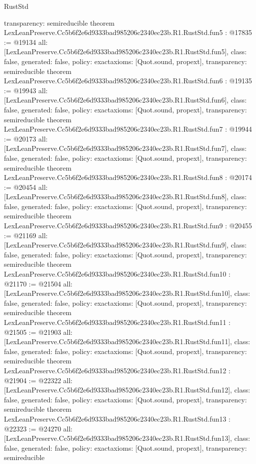 \begin{lexlean}{RustStd}
\begin{coremodule}
{  transparency: semireducible
}
theorem LexLeanPreserve.Cc5b6f2e6d9333bad985206c2340ec23b.R1.RustStd.fun5 : @17835 := @19134 {
  all: [LexLeanPreserve.Cc5b6f2e6d9333bad985206c2340ec23b.R1.RustStd.fun5],
  class: false,
  generated: false,
  policy: exact{axioms: [Quot.sound, propext]},
  transparency: semireducible
}
theorem LexLeanPreserve.Cc5b6f2e6d9333bad985206c2340ec23b.R1.RustStd.fun6 : @19135 := @19943 {
  all: [LexLeanPreserve.Cc5b6f2e6d9333bad985206c2340ec23b.R1.RustStd.fun6],
  class: false,
  generated: false,
  policy: exact{axioms: [Quot.sound, propext]},
  transparency: semireducible
}
theorem LexLeanPreserve.Cc5b6f2e6d9333bad985206c2340ec23b.R1.RustStd.fun7 : @19944 := @20173 {
  all: [LexLeanPreserve.Cc5b6f2e6d9333bad985206c2340ec23b.R1.RustStd.fun7],
  class: false,
  generated: false,
  policy: exact{axioms: [Quot.sound, propext]},
  transparency: semireducible
}
theorem LexLeanPreserve.Cc5b6f2e6d9333bad985206c2340ec23b.R1.RustStd.fun8 : @20174 := @20454 {
  all: [LexLeanPreserve.Cc5b6f2e6d9333bad985206c2340ec23b.R1.RustStd.fun8],
  class: false,
  generated: false,
  policy: exact{axioms: [Quot.sound, propext]},
  transparency: semireducible
}
theorem LexLeanPreserve.Cc5b6f2e6d9333bad985206c2340ec23b.R1.RustStd.fun9 : @20455 := @21169 {
  all: [LexLeanPreserve.Cc5b6f2e6d9333bad985206c2340ec23b.R1.RustStd.fun9],
  class: false,
  generated: false,
  policy: exact{axioms: [Quot.sound, propext]},
  transparency: semireducible
}
theorem LexLeanPreserve.Cc5b6f2e6d9333bad985206c2340ec23b.R1.RustStd.fun10 : @21170 := @21504 {
  all: [LexLeanPreserve.Cc5b6f2e6d9333bad985206c2340ec23b.R1.RustStd.fun10],
  class: false,
  generated: false,
  policy: exact{axioms: [Quot.sound, propext]},
  transparency: semireducible
}
theorem LexLeanPreserve.Cc5b6f2e6d9333bad985206c2340ec23b.R1.RustStd.fun11 : @21505 := @21903 {
  all: [LexLeanPreserve.Cc5b6f2e6d9333bad985206c2340ec23b.R1.RustStd.fun11],
  class: false,
  generated: false,
  policy: exact{axioms: [Quot.sound, propext]},
  transparency: semireducible
}
theorem LexLeanPreserve.Cc5b6f2e6d9333bad985206c2340ec23b.R1.RustStd.fun12 : @21904 := @22322 {
  all: [LexLeanPreserve.Cc5b6f2e6d9333bad985206c2340ec23b.R1.RustStd.fun12],
  class: false,
  generated: false,
  policy: exact{axioms: [Quot.sound, propext]},
  transparency: semireducible
}
theorem LexLeanPreserve.Cc5b6f2e6d9333bad985206c2340ec23b.R1.RustStd.fun13 : @22323 := @24270 {
  all: [LexLeanPreserve.Cc5b6f2e6d9333bad985206c2340ec23b.R1.RustStd.fun13],
  class: false,
  generated: false,
  policy: exact{axioms: [Quot.sound, propext]},
  transparency: semireducible
}
\end{coremodule}
\end{lexlean}
